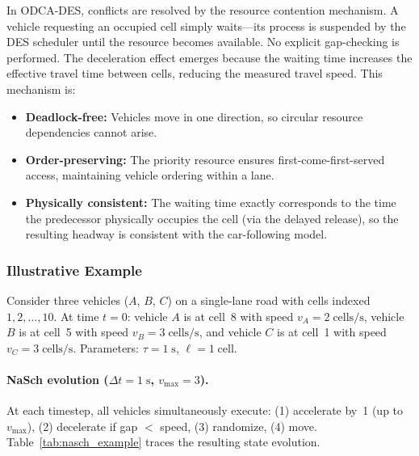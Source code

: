 \documentclass[review,authoryear]{elsarticle}
\providecommand{\DIFdelbegin}{} %
\providecommand{\DIFdelend}{} %
\newcommand{\DIFscaledelfig}{0.5}
\newlength{\DIFdelgraphicswidth} %
\newlength{\DIFdelgraphicsheight} %
\newcommand{\DIFdelincludegraphics}[2][]{%
\sbox{\DIFdelgraphicsbox}{\DIFOincludegraphics[#1]{#2}}%
\settoboxwidth{\DIFdelgraphicswidth}{\DIFdelgraphicsbox} %
\settoboxtotalheight{\DIFdelgraphicsheight}{\DIFdelgraphicsbox} %
\scalebox{\DIFscaledelfig}{%
\parbox[b]{\DIFdelgraphicswidth}{\usebox{\DIFdelgraphicsbox}\\[-\baselineskip] \rule{\DIFdelgraphicswidth}{0em}}\llap{\resizebox{\DIFdelgraphicswidth}{\DIFdelgraphicsheight}{%
\setlength{\unitlength}{\DIFdelgraphicswidth}%
\begin{picture}(1,1)%
\thicklines\linethickness{2pt} %
{\color[rgb]{1,0,0}\put(0,0){\framebox(1,1){}}}%
{\color[rgb]{1,0,0}\put(0,0){\line( 1,1){1}}}%
{\color[rgb]{1,0,0}\put(0,1){\line(1,-1){1}}}%
\end{picture}%
}\hspace*{3pt}}} %
} %
\DeclareRobustCommand{\DIFdelbegin}{\DIFOdelbegin \let\includegraphics\DIFdelincludegraphics} %
\DeclareRobustCommand{\DIFdelend}{\DIFOaddend \let\includegraphics\DIFOincludegraphics} %
\begin{document}
In ODCA-DES, conflicts are resolved by the resource contention mechanism. A vehicle requesting an occupied cell simply waits---its process is suspended by the DES scheduler until the resource becomes available. No explicit gap-checking is performed. The deceleration effect emerges because the waiting time increases the effective travel time between cells, reducing the measured travel speed. This mechanism is:
\begin{itemize}
    \item \textbf{Deadlock-free:} Vehicles move in one direction, so circular resource dependencies cannot arise.
    \item \textbf{Order-preserving:} The priority resource ensures first-come-first-served access, maintaining vehicle ordering within a lane.
    \item \textbf{Physically consistent:} The waiting time exactly corresponds to the time the predecessor physically occupies the cell (via the delayed release), so the resulting headway is consistent with the car-following model.
\end{itemize}

\subsubsection{Illustrative Example}
\DIFdelbegin %
\DIFdelend 

Consider three vehicles ($A$, $B$, $C$) on a single-lane road with cells indexed $1, 2, \ldots, 10$. At time $t=0$: vehicle $A$ is at cell~8 with speed $v_A = 2\;\text{cells/s}$, vehicle $B$ is at cell~5 with speed $v_B = 3\;\text{cells/s}$, and vehicle $C$ is at cell~1 with speed $v_C = 3\;\text{cells/s}$. Parameters: $\tau = 1\;\text{s}$, $\ell = 1\;\text{cell}$.

\paragraph{NaSch evolution ($\Delta t = 1\;\text{s}$, $v_{\max} = 3$).}
At each timestep, all vehicles simultaneously execute: (1) accelerate by~1 (up to $v_{\max}$), (2) decelerate if gap $<$ speed, (3) randomize, (4) move. Table~\ref{tab:nasch_example} traces the resulting state evolution.
\end{document}

